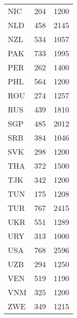 \begin{table}
\begin{tabular}{lrr}
NIC & 204 & 1200 \\
NLD & 458 & 2145 \\
NZL & 534 & 1057 \\
PAK & 733 & 1995 \\
PER & 262 & 1400 \\
PHL & 564 & 1200 \\
ROU & 274 & 1257 \\
RUS & 439 & 1810 \\
SGP & 485 & 2012 \\
SRB & 384 & 1046 \\
SVK & 298 & 1200 \\
THA & 372 & 1500 \\
TJK & 342 & 1200 \\
TUN & 175 & 1208 \\
TUR & 767 & 2415 \\
UKR & 551 & 1289 \\
URY & 313 & 1000 \\
USA & 768 & 2596 \\
UZB & 294 & 1250 \\
VEN & 519 & 1190 \\
VNM & 325 & 1200 \\
ZWE & 349 & 1215 \\
\bottomrule
\end{tabular}
\end{table}

